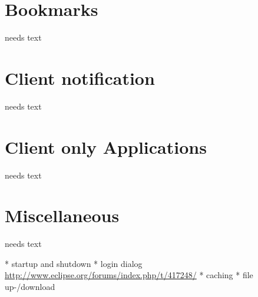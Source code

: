 \documentclass[a4paper,10pt,twoside]{book}
\begin{document}
\section{Bookmarks}
needs text
  
\section{Client notification}
needs text
    
\section{Client only Applications}
needs text
  
\section{Miscellaneous}
needs text

  * startup and shutdown
  * login dialog \url{http://www.eclipse.org/forums/index.php/t/417248/}
  * caching
  * file up-/download
  

\ifx\wholebook\relax\else
   
   
\end{document}
